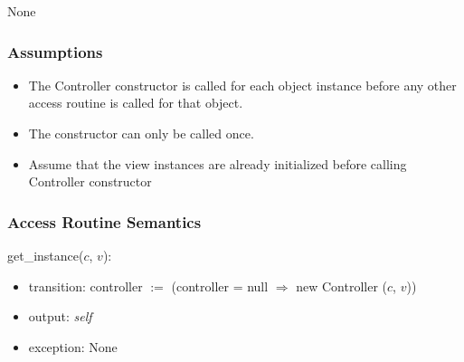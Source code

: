 \documentclass[12pt]{article}
\begin{document}
None

\subsubsection* {Assumptions}

\begin{itemize}
  \item The Controller constructor is called for each object instance before any
  other access routine is called for that object.  
  \item The constructor can only be called once.
  \item Assume that the view instances are already initialized before calling 
  Controller constructor
\end{itemize}

\subsubsection* {Access Routine Semantics}

get\_instance($c$, $v$):
\begin{itemize}
  \item transition: controller $:=$ (controller = null $\Rightarrow$ new Controller ($c$, $v$))
  \item output: \textit{self}
  \item exception: None
\end{itemize}



\end{document}
